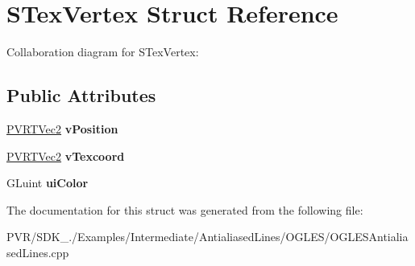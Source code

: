 \hypertarget{struct_s_tex_vertex}{\section{S\+Tex\+Vertex Struct Reference}
\label{struct_s_tex_vertex}
}


Collaboration diagram for S\+Tex\+Vertex\+:
\subsection*{Public Attributes}
\begin{DoxyCompactItemize}
\item 
\hypertarget{struct_s_tex_vertex_a71a396fd10d42ba35003f27d54b92762}{\hyperlink{struct_p_v_r_t_vec2}{P\+V\+R\+T\+Vec2} {\bfseries v\+Position}}\label{struct_s_tex_vertex_a71a396fd10d42ba35003f27d54b92762}

\item 
\hypertarget{struct_s_tex_vertex_a819354267a4dd1990f2c79953d709c6e}{\hyperlink{struct_p_v_r_t_vec2}{P\+V\+R\+T\+Vec2} {\bfseries v\+Texcoord}}\label{struct_s_tex_vertex_a819354267a4dd1990f2c79953d709c6e}

\item 
\hypertarget{struct_s_tex_vertex_abb3e3e9ac42f4466af43dee0318c241b}{G\+Luint {\bfseries ui\+Color}}\label{struct_s_tex_vertex_abb3e3e9ac42f4466af43dee0318c241b}

\end{DoxyCompactItemize}


The documentation for this struct was generated from the following file\+:\begin{DoxyCompactItemize}
\item 
P\+V\+R/\+S\+D\+K\+\_./\+Examples/\+Intermediate/\+Antialiased\+Lines/\+O\+G\+L\+E\+S/O\+G\+L\+E\+S\+Antialiased\+Lines.\+cpp\end{DoxyCompactItemize}
